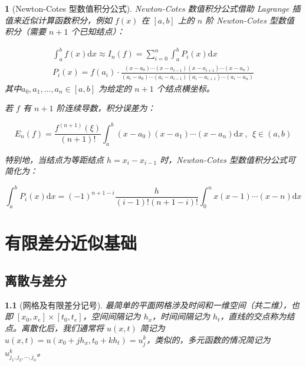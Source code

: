 \documentclass[zihao=5,UTF8]{report}
\theoremstyle{MyTheoremStyle} %
\theoremstyle{MySubsubsectionStyle} %
\newtheorem{definition}{}
\begin{document}
\begin{definition}[Newton-Cotes 型数值积分公式]

Newton-Cotes 数值积分公式借助 Lagrange 插值来近似计算函数积分，例如 $f(x)$ 在 $[a,b]$ 上的 $n$ 阶 Newton-Cotes 型数值积分（需要 $n+1$ 个已知结点）：

\begin{gather}
    \int_{a}^{b} f(x)\mathrm{d}x \approx I_n(f) = 
    \sum_{i=0}^{n} \int_{a}^{b} P_i(x) \mathrm{d}x
    \\ 
    P_i(x) = f(a_i)\cdot\frac{(x-a_{0})\cdots(x-a_{i-1})(x-a_{i+1})\cdots(x-a_{n})}{(a_{i}-a_{0})\cdots(a_{i}-a_{i-1})(a_{i}-a_{i+1})\cdots(a_{i}-a_{n})}
\end{gather}
其中$a_0,a_1, ..., a_{n} \in [a,b]$ 为给定的 $n+1$ 个结点横坐标。 

若 $f$ 有 $n+1$ 阶连续导数，积分误差为：

\begin{equation}
   E_n(f) =  \frac{f^{(n+1)}(\xi)}{(n+1)!} \int_{a}^{b}(x-a_{0})(x-a_{1})\cdots(x-a_{n})\mathrm{d}x\ ,\ \ \xi \in (a,b)
\end{equation}

特别地，当结点为等距结点 $h = x_i - x_{i-1}$ 时，Newton-Cotes 型数值积分公式可简化为：

\begin{equation}
    \int_{a}^{b} P_i(x) \mathrm{d}x = (-1)^{n+1-i}\frac{h}{(i-1)!(n+1-i)!}\int_{0}^{n} x(x-1)\cdots(x-n)\mathrm{d}x
\end{equation}

\end{definition}

\chapter{有限差分近似基础}

\section{离散与差分}

\begin{definition}[网格及有限差分记号]
最简单的平面网格涉及时间和一维空间（共二维），也即 $[x_0,x_e] \times [t_0,t_e]$，空间间隔记为 $h_x$，时间间隔记为 $h_t$，直线的交点称为结点。离散化后，我们通常将 $u(x,t)$ 简记为 $u(x,t) = u(x_0 + jh_x, t_0 + kh_t) = u_j^k$，类似的，多元函数的情况简记为 $u_{j_1,j_2,\cdots,j_n}^k$。




\end{definition}
\end{document}
